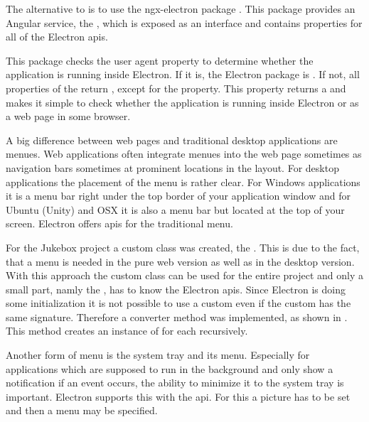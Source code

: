 
The alternative to  is to use the ngx-electron package \cite{ngxElectron}. This package provides an Angular service, the , which is exposed as an interface and contains properties for all of the Electron \gls{api}s.

This package checks the user agent property to determine whether the application is running inside Electron. If it is, the Electron package is . If not, all properties of the  return , except for the  property. This property returns a  and makes it simple to check whether the application is running inside Electron or as a web page in some browser.


A big difference between web pages and traditional desktop applications are menues. Web applications often integrate menues into the web page sometimes as navigation bars sometimes at prominent locations in the layout. For desktop applications the placement of the menu is rather clear. For Windows applications it is a menu bar right under the top border of your application window and for Ubuntu (Unity) and OSX it is also a menu bar but located at the top of your screen. Electron offers \gls{api}s for the traditional menu.



For the Jukebox project a custom  class was created, the . This is due to the fact, that a menu is needed in the pure web version as well as in the desktop version. With this approach the custom class can be used for the entire project and only a small part, namly the , has to know the Electron \gls{api}s. Since Electron is doing some initialization it is not possible to use a custom  even if the custom  has the same signature. Therefore a converter method was implemented, as shown in . This method creates an instance of  for each  recursively.



Another form of menu is the system tray and its menu. Especially for applications which are supposed to run in the background and only show a notification if an event occurs, the ability to minimize it to the system tray is important. Electron supports this with the  \gls{api}. For this a picture has to be set and then a menu may be specified.

